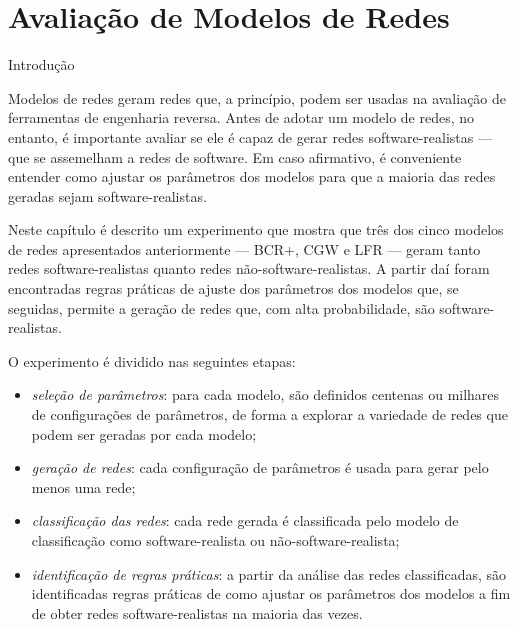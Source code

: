 \chapter{Avaliação de Modelos de Redes} \label{cap:avaliacao}

%


\begin{section}{Introdução}

	Modelos de redes geram redes que, a princípio, podem ser usadas na avaliação de ferramentas de engenharia reversa. Antes de adotar um modelo de redes, no entanto, é importante avaliar se ele é capaz de gerar redes software-realistas --- que se assemelham a redes de software. Em caso afirmativo, é conveniente entender como ajustar os parâmetros dos modelos para que a maioria das redes geradas sejam software-realistas.

	Neste capítulo é descrito um experimento que mostra que três dos cinco modelos de redes apresentados anteriormente --- BCR+, CGW e LFR --- geram tanto redes software-realistas quanto redes não-software-realistas. A partir daí foram encontradas regras práticas de ajuste dos parâmetros dos modelos que, se seguidas, permite a geração de redes que, com alta probabilidade, são software-realistas.
	
	O experimento é dividido nas seguintes etapas:
	
	\begin{itemize}
		\item \emph{seleção de parâmetros}: para cada modelo, são definidos centenas ou milhares de configurações de parâmetros, de forma a explorar a variedade de redes que podem ser geradas por cada modelo;
		\item \emph{geração de redes}: cada configuração de parâmetros é usada para gerar pelo menos uma rede;
		\item \emph{classificação das redes}: cada rede gerada é classificada pelo modelo de classificação como software-realista ou não-software-realista;
		\item \emph{identificação de regras práticas}: a partir da análise das redes classificadas, são identificadas regras práticas de como ajustar os parâmetros dos modelos a fim de obter redes software-realistas na maioria das vezes.
	\end{itemize}

\end{section}

